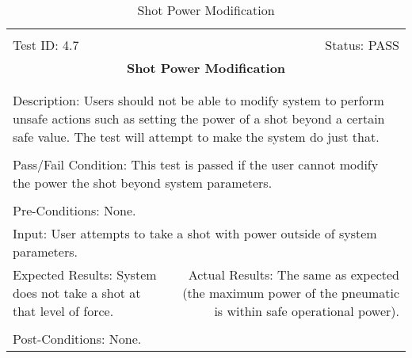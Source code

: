 \documentclass[titlepage]{article}
\begin{document}
\begin{center}
\begin{table}[h!]
\begin{tabular}{|l r|}\hline&\\[-2mm]
	Test ID: 4.7	&Status: PASS\\[-3mm]
	\multicolumn{2}{|c|}{\textbf{\large{Shot Power Modification}}}\\&\\\hline&\\[-3mm]
	\multicolumn{2}{|p{\textwidth}|}{Description: Users should not be able to modify system to perform unsafe actions such as setting the power of a shot beyond a certain safe value. The test will attempt to make the system do just that.}\\[1mm]\hline&\\[-3mm]
	\multicolumn{2}{|p{\textwidth}|}{Pass/Fail Condition: This test is passed if the user cannot modify the power the shot beyond system parameters.}\\[1mm]\hline&\\[-3mm]
	\multicolumn{2}{|p{\textwidth}|}{Pre-Conditions: None.}\\[4mm]
	\multicolumn{2}{|p{\textwidth}|}{Input: User attempts to take a shot with power outside of system parameters.}\\[2mm]\hline
	\multicolumn{1}{|p{0.49\textwidth}}{Expected Results: System does not take a shot at that level of force.}	&\multicolumn{1}{|p{0.45\textwidth}|}{Actual Results: The same as expected (the maximum power of the pneumatic is within safe operational power).}\\\hline&\\[-3mm]
	\multicolumn{2}{|p{\textwidth}|}{Post-Conditions: None.}\\\hline
\end{tabular}
\caption{Shot Power Modification}
\end{table}
\end{center}
\end{document}
